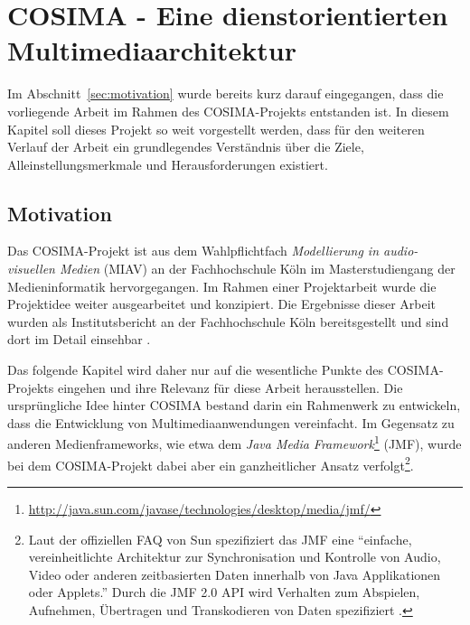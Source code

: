 
\chapter{COSIMA - Eine dienstorientierten Multimediaarchitektur} %
\label{cha:eine_dienstorientierten_multimediaarchitektur}

  Im Abschnitt~\ref{sec:motivation} wurde bereits kurz darauf eingegangen, dass die vorliegende Arbeit im Rahmen des COSIMA-Projekts entstanden ist. In diesem Kapitel soll dieses Projekt so weit vorgestellt werden, dass für den weiteren Verlauf der Arbeit ein grundlegendes Verständnis über die Ziele, Alleinstellungsmerkmale und Herausforderungen existiert.
  
\section{Motivation} %
\label{sec:motivation_cosima}

  Das COSIMA-Projekt ist aus dem Wahlpflichtfach \emph{Modellierung in audio-visuellen Medien} (MIAV) an der Fachhochschule Köln im Masterstudiengang der Medieninformatik hervorgegangen. Im Rahmen einer Projektarbeit wurde die Projektidee weiter ausgearbeitet und konzipiert. Die Ergebnisse dieser Arbeit wurden als Institutsbericht an der Fachhochschule Köln bereitsgestellt und sind dort im Detail einsehbar \citep{bericht}.
  
  Das folgende Kapitel wird daher nur auf die wesentliche Punkte des COSIMA-Projekts eingehen und ihre Relevanz für diese Arbeit herausstellen. Die ursprüngliche Idee hinter COSIMA bestand darin ein Rahmenwerk zu entwickeln, dass die Entwicklung von Multimediaanwendungen vereinfacht. Im Gegensatz zu anderen Medienframeworks, wie etwa dem \emph{Java Media Framework}\footnote{\url{http://java.sun.com/javase/technologies/desktop/media/jmf/}} (JMF), wurde bei dem COSIMA-Projekt dabei aber ein ganzheitlicher Ansatz verfolgt\footnote{Laut der offiziellen FAQ von Sun spezifiziert das JMF eine "`einfache, vereinheitlichte Architektur zur Synchronisation und Kontrolle von Audio, Video oder anderen zeitbasierten Daten innerhalb von Java Applikationen oder Applets."' Durch die JMF 2.0 API wird Verhalten zum Abspielen, Aufnehmen, Übertragen und Transkodieren von Daten spezifiziert \citep{jmf_faq}.}.
  

